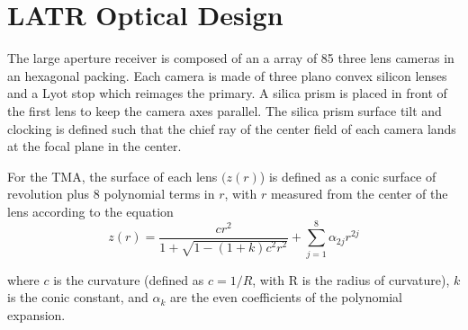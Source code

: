 \documentclass{article}
\begin{document}
\section{LATR Optical Design}

The large aperture receiver is composed of an a array of 85 three lens cameras in an hexagonal packing. Each camera is made of three plano convex silicon lenses and a Lyot stop which reimages the primary. A silica prism is placed in front of the first lens to keep the camera axes parallel. The silica prism surface tilt and clocking is defined such that the chief ray of the center field of each camera lands at the focal plane in the center.

For the TMA, the surface of each lens $(z(r)$) is defined as a conic surface of revolution plus 8 polynomial terms in $r$, with $r$ measured from the center of the lens according to the equation\begin{equation}
	z(r) = \frac{cr^2}{1+\sqrt{1-(1+k)c^2r^2}} + \sum_{j=1}^{8} \alpha_{2j} r^{2j}
\end{equation}

where $c$ is the curvature (defined as $c=1/R$, with R is the radius of curvature), $k$ is the conic constant, and $\alpha_{k}$ are the even coefficients of the polynomial expansion. 
\end{document}
